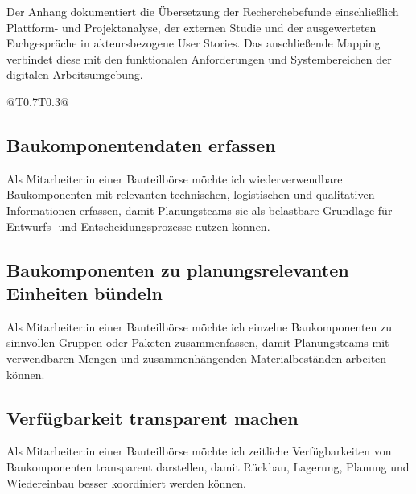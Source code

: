 \label{anlage:user-stories}

Der Anhang dokumentiert die Übersetzung der Recherchebefunde einschließlich Plattform- und Projektanalyse, der externen Studie und der ausgewerteten Fachgespräche in akteursbezogene User Stories. Das anschließende Mapping verbindet diese mit den funktionalen Anforderungen und Systembereichen der digitalen Arbeitsumgebung.

\begin{Table}[title=Übersicht]
\begin{SemioTable}{@{}T{0.7\tabcolsep}T{0.3\tabcolsep}@{}}
\end{SemioTable}
\end{Table}


\subsection{Baukomponentendaten erfassen}
\label{us:bb-01} Als Mitarbeiter:in einer Bauteilbörse möchte ich wiederverwendbare Baukomponenten mit relevanten technischen, logistischen und qualitativen Informationen erfassen, damit Planungsteams sie als belastbare Grundlage für Entwurfs- und Entscheidungsprozesse nutzen können.

\subsection{Baukomponenten zu planungsrelevanten Einheiten bündeln}
\label{us:bb-02} Als Mitarbeiter:in einer Bauteilbörse möchte ich einzelne Baukomponenten zu sinnvollen Gruppen oder Paketen zusammenfassen, damit Planungsteams mit verwendbaren Mengen und zusammenhängenden Materialbeständen arbeiten können.

\subsection{Verfügbarkeit transparent machen}
\label{us:bb-03} Als Mitarbeiter:in einer Bauteilbörse möchte ich zeitliche Verfügbarkeiten von Baukomponenten transparent darstellen, damit Rückbau, Lagerung, Planung und Wiedereinbau besser koordiniert werden können.

